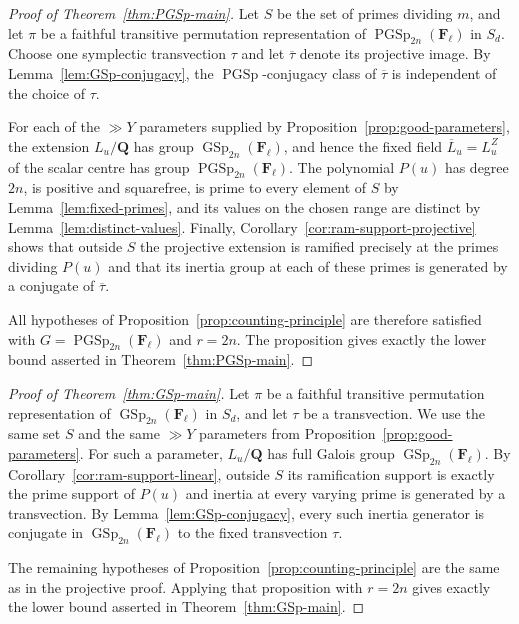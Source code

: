 \documentclass[11pt,hidelinks]{amsart}
\newcommand{\Q}{\mathbf Q}
\newcommand{\F}{\mathbf F}
\newcommand{\GSp}{\operatorname{GSp}}
\newcommand{\PGSp}{\operatorname{PGSp}}
\begin{document}
\begin{proof}[Proof of Theorem~\ref{thm:PGSp-main}]
Let $S$ be the set of primes dividing $m$, and let $\pi$ be a faithful transitive permutation representation of $\PGSp_{2n}(\F_\ell)$ in $S_d$. Choose one symplectic transvection $\tau$ and let $\overline\tau$ denote its projective image. By Lemma~\ref{lem:GSp-conjugacy}, the $\PGSp$-conjugacy class of $\overline\tau$ is independent of the choice of $\tau$.

For each of the $\gg Y$ parameters supplied by Proposition~\ref{prop:good-parameters}, the extension $L_u/\Q$ has group $\GSp_{2n}(\F_\ell)$, and hence the fixed field $\overline L_u=L_u^Z$ of the scalar centre has group $\PGSp_{2n}(\F_\ell)$. The polynomial $P(u)$ has degree $2n$, is positive and squarefree, is prime to every element of $S$ by Lemma~\ref{lem:fixed-primes}, and its values on the chosen range are distinct by Lemma~\ref{lem:distinct-values}. Finally, Corollary~\ref{cor:ram-support-projective} shows that outside $S$ the projective extension is ramified precisely at the primes dividing $P(u)$ and that its inertia group at each of these primes is generated by a conjugate of $\overline\tau$.

All hypotheses of Proposition~\ref{prop:counting-principle} are therefore satisfied with $G=\PGSp_{2n}(\F_\ell)$ and $r=2n$. The proposition gives exactly the lower bound asserted in Theorem~\ref{thm:PGSp-main}.
\end{proof}

\begin{proof}[Proof of Theorem~\ref{thm:GSp-main}]
Let $\pi$ be a faithful transitive permutation representation of $\GSp_{2n}(\F_\ell)$ in $S_d$, and let $\tau$ be a transvection. We use the same set $S$ and the same $\gg Y$ parameters from Proposition~\ref{prop:good-parameters}. For such a parameter, $L_u/\Q$ has full Galois group $\GSp_{2n}(\F_\ell)$. By Corollary~\ref{cor:ram-support-linear}, outside $S$ its ramification support is exactly the prime support of $P(u)$ and inertia at every varying prime is generated by a transvection. By Lemma~\ref{lem:GSp-conjugacy}, every such inertia generator is conjugate in $\GSp_{2n}(\F_\ell)$ to the fixed transvection $\tau$.

The remaining hypotheses of Proposition~\ref{prop:counting-principle} are the same as in the projective proof. Applying that proposition with $r=2n$ gives exactly the lower bound asserted in Theorem~\ref{thm:GSp-main}.
\end{proof}
\end{document}
